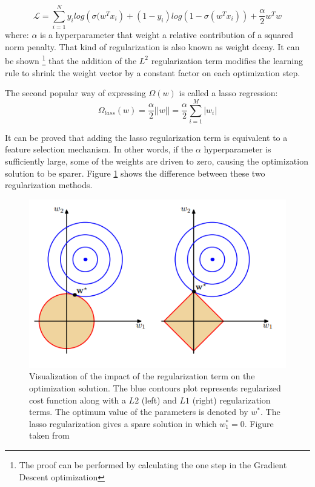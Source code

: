 \begin{equation}
    \mathcal{L} =  \sum_{i=1}^{N}y_{i}log\left( \sigma(w^{T}x_{i}\right)+(1-y_i)log(1-\sigma(w^{T}x_{i})) + \frac{\alpha}{2} w^{T}w
\end{equation}
where: $\alpha$ is a hyperparameter that weight a relative contribution of a squared norm penalty. 
That kind of regularization is also known as weight decay. It can be shown \footnote{The proof can be performed by calculating the one step in the Gradient Descent optimization} that the addition of the $L^2$  regularization term modifies the learning rule to shrink the weight vector by a constant factor on each optimization step. 

The second popular way of expressing $\Omega(w)$ is called a lasso regression:
\begin{equation}
    \Omega_{lass}(w) = \frac{\alpha}{2} ||w|| = \frac{\alpha}{2} \sum_{i=1}^{M} |w_i|
\end{equation}

It can be proved that adding the lasso regularization term is equivalent to a feature selection mechanism. In other words, if the $\alpha$ hyperparameter is sufficiently large, some of the weights are driven to zero, causing the optimization solution to be sparer. Figure \ref{fig:L1vsL2} shows the difference between these two regularization methods.  



\begin{figure}[!h]
\centering
\includegraphics{figures/L1vsL2.PNG}
\caption{Visualization of the impact of the regularization term on the optimization solution. The blue contours plot represents regularized cost function along with a $L2$ (left) and $L1$ (right) regularization terms. The optimum value of the parameters is denoted by $w^{*}$. The lasso regularization gives a spare solution in which $w_{1}^*=0$. Figure taken from \cite{bishop}  
\label{fig:L1vsL2}}
\end{figure}

